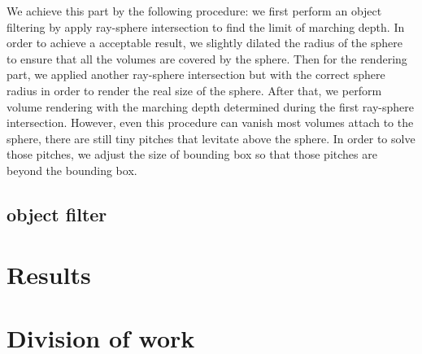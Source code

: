 \documentclass[acmtog]{acmart}
\begin{document}
    We achieve this part by the following procedure: we first perform an object filtering by apply ray-sphere intersection to find the limit of marching depth.
    In order to achieve a acceptable result, we slightly dilated the radius of the sphere to ensure that all the volumes are covered by the sphere.
    Then for the rendering part, we applied another ray-sphere intersection but with the correct sphere radius in order to render the real size of the sphere.
    After that, we perform volume rendering with the marching depth determined during the first ray-sphere intersection.
    However, even this procedure can vanish most volumes attach to the sphere, there are still tiny pitches that levitate above the sphere.
    In order to solve those pitches, we adjust the size of bounding box so that those pitches are beyond the bounding box.


    \subsection{object filter}\label{subsec:object-filter}


    \section{Results}\label{sec:results}


    \section{Division of work}\label{sec:division-of-work}
\end{document}
